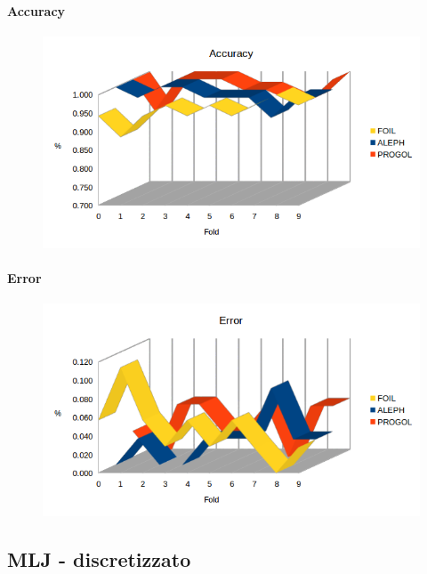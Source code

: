 \paragraph{Accuracy}
\begin{figure}[h!tbp]
	\includegraphics[width=1.2\textwidth]{img/datasetGraph/svln/accuracy.png}
	\label{svln-Accuracy}
\end{figure}
\paragraph{Error}
\begin{figure}[h!tbp]
	\includegraphics[width=1.2\textwidth]{img/datasetGraph/svln/error.png}
	\label{svln-Error}
\end{figure}

\subsection{MLJ - discretizzato}
